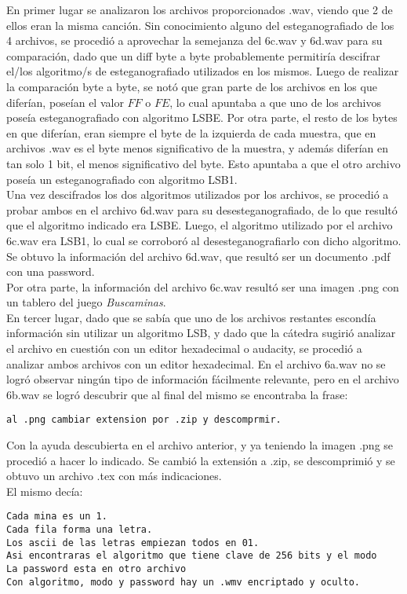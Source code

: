\documentclass{article}
\begin{document}
\noindent En primer lugar se analizaron los archivos proporcionados .wav, viendo que 2 de ellos eran la misma canción. Sin conocimiento alguno del esteganografiado de los 4 archivos, se procedió a aprovechar la semejanza del 6c.wav y 6d.wav para su comparación, dado que un diff byte a byte probablemente permitiría descifrar el/los algoritmo/s de esteganografiado utilizados en los mismos.
\noindent Luego de realizar la comparación byte a byte, se notó que gran parte de los archivos en los que diferían, poseían el valor $FF$ o $FE$, lo cual apuntaba a que uno de los archivos poseía esteganografiado con algoritmo LSBE. Por otra parte, el resto de los bytes en que diferían, eran siempre el byte de la izquierda de cada muestra, que en archivos .wav es el byte menos significativo de la muestra, y además diferían en tan solo 1 bit, el menos significativo del byte. Esto apuntaba a que el otro archivo poseía un esteganografiado con algoritmo LSB1.\\
\noindent Una vez descifrados los dos algoritmos utilizados por los archivos, se procedió a probar ambos en el archivo 6d.wav para su desesteganografiado, de lo que resultó que el algoritmo indicado era LSBE. Luego, el algoritmo utilizado por el archivo 6c.wav era LSB1, lo cual se corroboró al desesteganografiarlo con dicho algoritmo.\\
\noindent Se obtuvo la información del archivo 6d.wav, que resultó ser un documento .pdf con una password.\\
\noindent Por otra parte, la información del archivo 6c.wav resultó ser una imagen .png con un tablero del juego \textit{Buscaminas}.\\
\noindent En tercer lugar, dado que se sabía que uno de los archivos restantes escondía información sin utilizar un algoritmo LSB, y dado que la cátedra sugirió analizar el archivo en cuestión con un editor hexadecimal o audacity, se procedió a analizar ambos archivos con un editor hexadecimal. En el archivo 6a.wav no se logró observar ningún tipo de información fácilmente relevante, pero en el archivo 6b.wav se logró descubrir que al final del mismo se encontraba la frase:
\begin{verbatim}
al .png cambiar extension por .zip y descomprmir.
\end{verbatim}

\noindent Con la ayuda descubierta en el archivo anterior, y ya teniendo la imagen .png se procedió a hacer lo indicado. Se cambió la extensión a .zip, se descomprimió y se obtuvo un archivo .tex con más indicaciones.\\
El mismo decía:
\begin{verbatim}
Cada mina es un 1.
Cada fila forma una letra.
Los ascii de las letras empiezan todos en 01.
Asi encontraras el algoritmo que tiene clave de 256 bits y el modo
La password esta en otro archivo
Con algoritmo, modo y password hay un .wmv encriptado y oculto.
\end{verbatim}
\end{document}
